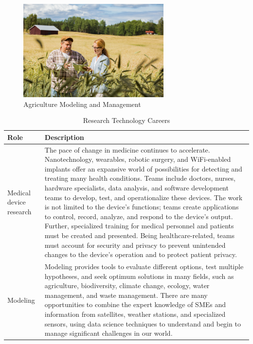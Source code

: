 \begin{figure}[H]
	\begin{center}
		\caption{Agriculture Modeling and Management}
		\vskip 4pt
		\includegraphics[height=2in]{images/careers/iStock-1272791496.small.jpg}
	\end{center}
\end{figure}

\begin{table}[H]
	\begin{center}
		\caption{Research Technology Careers}
		\vskip 4pt
		\begin{tabular}{p{1in}|p{3.4in}} 
			\textbf{Role} & \textbf{Description}\\
			\hline
			Medical device research & The pace of change in medicine continues to accelerate. Nanotechnology, wearables, robotic surgery, and WiFi-enabled implants offer an expansive world of possibilities for detecting and treating many health conditions. Teams include doctors, nurses, hardware specialists, data analysis, and software development teams to develop, test, and operationalize these devices. The work is not limited to the device's functions; teams create applications to control, record, analyze, and respond to the device's output. Further, specialized training for medical personnel and patients must be created and presented. Being healthcare-related, teams must account for security and privacy to prevent unintended changes to the device's operation and to protect patient privacy.\\
			\hline
			Modeling & Modeling provides tools to evaluate different options, test multiple hypotheses, and seek optimum solutions in many fields, such as agriculture, biodiversity, climate change, ecology, water management, and waste management. There are many opportunities to combine the expert knowledge of SMEs and information from satellites, weather stations, and specialized sensors, using data science techniques to understand and begin to manage significant challenges in our world.\\
			\hline
		\end{tabular}
	\end{center}
\end{table}

